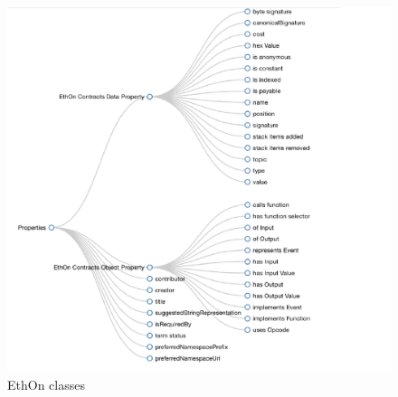 \begin{center}
\begin{figure}[htb!]
		\begin{minipage}{0.55\linewidth}
			\centering
			\includegraphics[width=1.65\textwidth]{images/chap02_EthOn_Properties.png}
		\end{minipage}
		\caption[EthOn Properties]{EthOn classes\cite{Rashid}}
		
		
	\end{figure}
	
\end{center}

